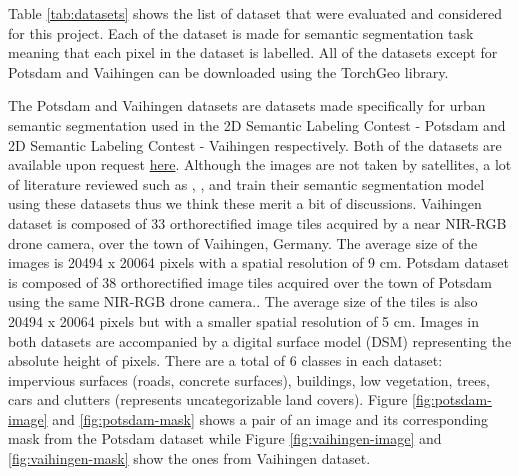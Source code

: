 \FloatBarrier

Table \ref{tab:datasets} shows the list of dataset that were evaluated and considered for this project. Each of the dataset is made for semantic segmentation task meaning that each pixel in the dataset is labelled. All of the datasets except for Potsdam and Vaihingen can be downloaded using the TorchGeo library. 

The Potsdam and Vaihingen datasets \cite{potsdam-vaihingen} are datasets made specifically for urban semantic segmentation used in the 2D Semantic Labeling Contest - Potsdam and 2D Semantic Labeling Contest - Vaihingen respectively. Both of the datasets are available upon request \href{https://www.isprs.org/education/benchmarks/UrbanSemLab/detection-and-reconstruction.aspx#VaihigenDataDescr}{here}. Although the images are not taken by satellites, a lot of literature reviewed such as \cite{unetformer}, \cite{a-novel-transformer}, \cite{multi-attention-network} and \cite{A2-FPN} train their semantic segmentation model using these datasets thus we think these merit a bit of discussions. Vaihingen dataset is composed of 33 orthorectified image tiles acquired by a near NIR-RGB drone camera, over the town of Vaihingen, Germany. The average size of the images is 20494 x 20064 pixels with a spatial resolution of 9 cm. Potsdam dataset is composed of 38 orthorectified image tiles acquired  over the town of Potsdam using the same NIR-RGB drone camera.. The average size of the tiles is also 20494 x 20064 pixels but with a smaller spatial resolution of 5 cm. Images in both datasets are accompanied by a digital surface model (DSM) representing the absolute height of pixels. There are a total of 6 classes in each dataset: impervious surfaces (roads, concrete surfaces), buildings, low vegetation, trees, cars and clutters (represents uncategorizable land covers).  Figure \ref{fig:potsdam-image} and \ref{fig:potsdam-mask} shows a pair of an image and its corresponding mask from the Potsdam dataset while Figure \ref{fig:vaihingen-image} and \ref{fig:vaihingen-mask} show the ones from Vaihingen dataset.


